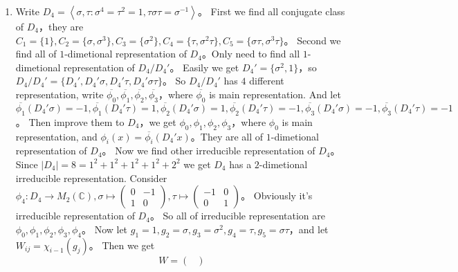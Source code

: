 \documentclass{ctexart}
\begin{document}
\begin{solution}
  \begin{enumerate}
    \item Write \(D_4=\left\langle \sigma,\tau:\sigma^4=\tau^2=1,\tau \sigma \tau = \sigma^{-1}\right\rangle \)\nolinebreak[4]。
      First we find all conjugate class of \(D_4\)\nolinebreak[4]，they are \(C_1=\{1\},C_2=\{\sigma,\sigma^3\},C_3=\{\sigma^2\},C_4=\{\tau,\sigma^2 \tau\},C_5=\{\sigma \tau,\sigma^3 \tau\}\)\nolinebreak[4]。
      Second we find all of \(1\)-dimetional representation of \(D_4\)\nolinebreak[4]。Only need to find all \(1\)-dimetional representation of \(D_4/D_4'\)\nolinebreak[4]。
      Easily we get \(D_4'=\{\sigma^2,1\}\)\nolinebreak[4]，so \(D_4/D_4'=\{D_4',D_4'\sigma,D_4'\tau,D_4'\sigma \tau\}\)\nolinebreak[4]。
      So \(D_4/D_4'\) has \(4\) different representation, write \(\overline{\phi_0},\overline{\phi_1},\overline{\phi_2},\overline{\phi_3}\)\nolinebreak[4]，where \(\overline{\phi_0}\) is main representation.
      And let \(\overline{\phi_1}(D_4'\sigma)=-1,\overline{\phi_1}(D_4'\tau)=1,\overline{\phi_2}(D_4'\sigma)=1,\overline{\phi_2}(D_4'\tau)=-1,\overline{\phi_3}(D_4'\sigma)=-1,\overline{\phi_3}(D_4'\tau)=-1\)\nolinebreak[4]。
      Then improve them to \(D_4\)\nolinebreak[4]，we get \(\phi_0,\phi_1,\phi_2,\phi_3\)\nolinebreak[4]，where \(\phi_0\) is main representation, and
      \(\phi_i(x)=\overline{\phi_i}(D_4'x)\)\nolinebreak[4]。They are all of \(1\)-dimetional representation of \(D_4\)\nolinebreak[4]。
      Now we find other irreducible representation of \(D_4\)\nolinebreak[4]。
      Since \(|D_4|=8=1^2+1^2+1^2+1^2+2^2\) we get \(D_4\) has a \(2\)-dimetional irreducible representation.
      Consider \(\phi_4:D_4 \to M_2(\mathbb{C}),\sigma \mapsto
        \begin{pmatrix}
          0 & -1 \\
          1 & 0
        \end{pmatrix},\tau \mapsto
        \begin{pmatrix}
          -1 & 0 \\
          0  & 1
      \end{pmatrix}\)\nolinebreak[4]。
      Obviously it's irreducible representation of \(D_4\)\nolinebreak[4]。
      So all of irreducible representation are \(\phi_0,\phi_1,\phi_2,\phi_3,\phi_4\)\nolinebreak[4]。
      Now let \(g_1=1,g_2=\sigma,g_3=\sigma^2,g_4=\tau,g_5=\sigma \tau\)\nolinebreak[4]，and let \(W_{ij}=\chi_{i-1}( g_j)\)\nolinebreak[4]。
      Then we get
      \[
        W=
        \begin{pmatrix}

\end{pmatrix}\]
\end{enumerate}
\end{solution}
\end{document}
